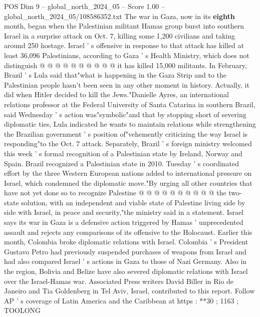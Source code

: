 \begin{textsample}{POS Dim 9 – global\_north\_2024\_05 – Score 1.00 – global\_north\_2024\_05/108586352.txt}
The war in Gaza, now in its \textbf{eighth} month, began when the Palestinian militant Hamas group burst into southern Israel in a surprise attack on Oct. 7, killing some 1,200 civilians and taking around 250 hostage.
Israel ' s offensive in response to that attack has killed at least 36,096 Palestinians, according to Gaza ' s Health Ministry, which does not distinguish @ @ @ @ @ @ @ @ @ @ it has killed 15,000 militants.
In February, Brazil ' s Lula said that"what is happening in the Gaza Strip and to the Palestinian people hasn't been seen in any other moment in history.
Actually, it did when Hitler decided to kill the Jews."Danielle Ayres, an international relations professor at the Federal University of Santa Catarina in southern Brazil, said Wednesday ' s action was"symbolic"and that by stopping short of severing diplomatic ties, Lula indicated he wants to maintain relations while strengthening the Brazilian government ' s position of"vehemently criticizing the way Israel is responding"to the Oct. 7 attack.
Separately, Brazil ' s foreign ministry welcomed this week ' s formal recognition of a Palestinian state by Ireland, Norway and Spain.
Brazil recognized a Palestinian state in 2010.
Tuesday ' s coordinated effort by the three Western European nations added to international pressure on Israel, which condemned the diplomatic move."By urging all other countries that have not yet done so to recognize Palestine @ @ @ @ @ @ @ @ @ @ the two-state solution, with an independent and viable state of Palestine living side by side with Israel, in peace and security,"the ministry said in a statement.
Israel says its war in Gaza is a defensive action triggered by Hamas ' unprecedented assault and rejects any comparisons of its offensive to the Holocaust.
Earlier this month, Colombia broke diplomatic relations with Israel.
Colombia ' s President Gustavo Petro had previously suspended purchases of weapons from Israel and had also compared Israel ' s actions in Gaza to those of Nazi Germany.
Also in the region, Bolivia and Belize have also severed diplomatic relations with Israel over the Israel-Hamas war.
Associated Press writers David Biller in Rio de Janeiro and Tia Goldenberg in Tel Aviv, Israel, contributed to this report.
Follow AP ' s coverage of Latin America and the Caribbean at https : **30 ; 1163 ; TOOLONG

\end{textsample}
